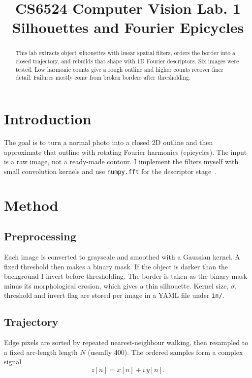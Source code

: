 \documentclass[conference]{IEEEtran}
\begin{document}
\title{CS6524 Computer Vision Lab. 1\\ Silhouettes and Fourier Epicycles}

\author{
}

\maketitle

\begin{abstract}
This lab extracts object silhouettes with linear spatial filters, orders the border into a closed trajectory, and rebuilds that shape with 1D Fourier descriptors. Six images were tested. Low harmonic counts give a rough outline and higher counts recover finer detail. Failures mostly come from broken borders after thresholding.
\end{abstract}

\section{Introduction}
The goal is to turn a normal photo into a closed 2D outline and then approximate that outline with rotating Fourier harmonics (epicycles). The input is a raw image, not a ready-made contour. I implement the filters myself with small convolution kernels and use \texttt{numpy.fft} for the descriptor stage~\cite{foundationsCVbook}.

\section{Method}
\subsection{Preprocessing}
Each image is converted to grayscale and smoothed with a Gaussian kernel. A fixed threshold then makes a binary mask. If the object is darker than the background I invert before thresholding. The border is taken as the binary mask minus its morphological erosion, which gives a thin silhouette. Kernel size, $\sigma$, threshold and invert flag are stored per image in a YAML file under \texttt{in/}.

\subsection{Trajectory}
Edge pixels are sorted by repeated nearest-neighbour walking, then resampled to a fixed arc-length length $N$ (usually 400). The ordered samples form a complex signal
\begin{equation}
z[n] = x[n] + i\, y[n].
\end{equation}
\end{document}
